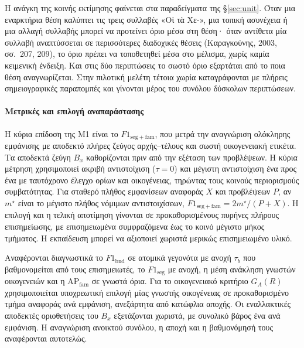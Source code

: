 \documentclass[a4paper]{article}
\begin{document}
Η ανάγκη της κοινής εκτίμησης φαίνεται στα παραδείγματα της §\ref{sec:unit}. Όταν μια εναρκτήρια θέση καλύπτει τις τρεις συλλαβές «Οἱ τὰ Χε-», μια τοπική ασυνέχεια ή μια αλλαγή συλλαβής μπορεί να προτείνει όριο μέσα στη θέση· όταν αντίθετα μία συλλαβή αναπτύσσεται σε περισσότερες διαδοχικές θέσεις (Καραγκούνης, 2003, σσ.~207, 209), το όριο πρέπει να τοποθετηθεί μέσα στο μέλισμα, χωρίς καμία κειμενική ένδειξη. Και στις δύο περιπτώσεις το σωστό όριο εξαρτάται από το ποια θέση αναγνωρίζεται. Στην πιλοτική μελέτη τέτοια χωρία καταγράφονται με πλήρεις σημειογραφικές παραπομπές και γίνονται μέρος του συνόλου δύσκολων περιπτώσεων.

\paragraph{Μετρικές και επιλογή αναπαράστασης}
Η κύρια επίδοση της Μ1 είναι το $F1_{\mathrm{seg+fam}}$, που μετρά την αναγνώριση ολόκληρης εμφάνισης με αποδεκτό πλήρες ζεύγος αρχής--τέλους και σωστή οικογενειακή ετικέτα. Τα αποδεκτά ζεύγη $B_x$ καθορίζονται πριν από την εξέταση των προβλέψεων. Η κύρια μέτρηση χρησιμοποιεί ακριβή αντιστοίχιση ($\tau=0$) και μέγιστη αντιστοίχιση ένα προς ένα με ταυτόχρονο έλεγχο ορίων και οικογένειας, τηρώντας τους κοινούς περιορισμούς συμβατότητας. Για σταθερό πλήθος εμφανίσεων αναφοράς $X$ και προβλέψεων $P$, αν $m^\star$ είναι το μέγιστο πλήθος νόμιμων αντιστοιχίσεων, $F1_{\mathrm{seg+fam}}=2m^\star/(P+X)$. Η επιλογή και η τελική αποτίμηση γίνονται σε προκαθορισμένους πυρήνες πλήρους επισημείωσης, με επισημειωμένα συμφραζόμενα έως το κοινό μέγιστο μήκος τμήματος. Η εκπαίδευση μπορεί να αξιοποιεί χωριστά μερικώς επισημειωμένο υλικό.

Αναφέρονται διαγνωστικά το $F1_{\mathrm{bnd}}$ σε ατομικά γεγονότα με ανοχή $\tau_b$ που βαθμονομείται από τους επισημειωτές, το $F1_{\mathrm{seg}}$ με ανοχή, η μέση ανάκληση γνωστών οικογενειών και η $\mathrm{AP}_{\mathrm{fam}}$ σε γνωστά όρια. Για το οικογενειακό κριτήριο $G_A(R)$ χρησιμοποιείται υποχρεωτική επιλογή μίας γνωστής οικογένειας σε προκαθορισμένο τμήμα αναφοράς ανά εμφάνιση, ανεξάρτητα από κατώφλια αποχής. Οι εναλλακτικές αποδεκτές οριοθετήσεις του $B_x$ εξετάζονται χωριστά, με συνολικό βάρος ένα ανά εμφάνιση. Η αναγνώριση ανοικτού συνόλου, η αποχή και η βαθμονόμησή τους αναφέρονται αυτοτελώς.
\end{document}
